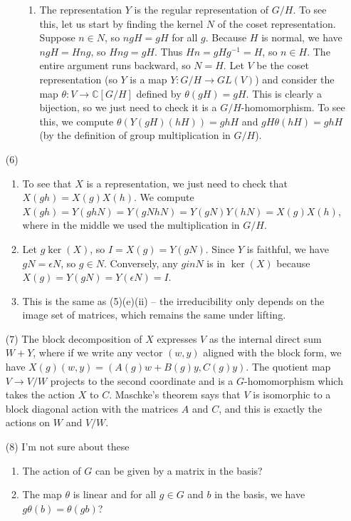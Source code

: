 \documentclass{amsart}
\begin{document}
\begin{enumerate}
\begin{enumerate}
\begin{enumerate}
              \item The representation $Y$ is the regular representation of $G/H$.  To see this, let us start by finding the kernel $N$ of the coset representation.  Suppose $n \in N$, so $ngH = gH$ for all $g$.  Because $H$ is normal, we have $ngH = Hng$, so $Hng = gH$.  Thus $Hn = gHg^{-1} = H$, so $n \in H$.  The entire argument runs backward, so $N=H$.  Let $V$ be the coset representation (so $Y$ is a map $Y:G/H \to GL(V)$) and consider the map $\theta : V \to \mathbb{C}[G/H]$ defined by $\theta(gH) = gH$.  This is clearly a bijection, so we just need to check it is a $G/H$-homomorphism.  To see this, we compute $\theta(Y(gH)(hH)) = ghH$ and $gH\theta(hH) = ghH$ (by the definition of group multiplication in $G/H$).
          \end{enumerate}
    \end{enumerate}
    \item[(6)]
    \begin{enumerate}
        \item To see that $X$ is a representation, we just need to check that $X(gh) = X(g)X(h)$.  We compute $X(gh) = Y(ghN) = Y(gNhN) = Y(gN)Y(hN) = X(g)X(h)$, where in the middle we used the multiplication in $G/H$.
        \item Let $g \ker(X)$, so $I = X(g) = Y(gN)$.  Since $Y$ is faithful, we have $gN = \epsilon N$, so $g \in N$.  Conversely, any $g in N$ is in $\ker(X)$ because $X(g) = Y(gN) = Y(\epsilon N) = I$.
        \item This is the same as (5)(e)(ii) -- the irreducibility only depends on the image set of matrices, which remains the same under lifting.
    \end{enumerate}
    \item[(7)] The block decomposition of $X$ expresses $V$ as the internal direct sum $W + Y$, where if we write any vector $(w,y)$ aligned with the block form, we have $X(g)(w,y) = (A(g)w + B(g)y, C(g)y)$.  The quotient map $V \to V/W$ projects to the second coordinate and is a $G$-homomorphism which takes the action $X$ to $C$.  Maschke's theorem says that $V$ is isomorphic to a block diagonal action with the matrices $A$ and $C$, and this is exactly the actions on $W$ and $V/W$.
    \item[(8)] I'm not sure about these
    \begin{enumerate}
        \item The action of $G$ can be given by a matrix in the basis?
        \item The map $\theta$ is linear and for all $g \in G$ and $b$ in the basis, we have $g\theta(b) = \theta (gb)$?

\end{enumerate}
\end{enumerate}
\end{document}
